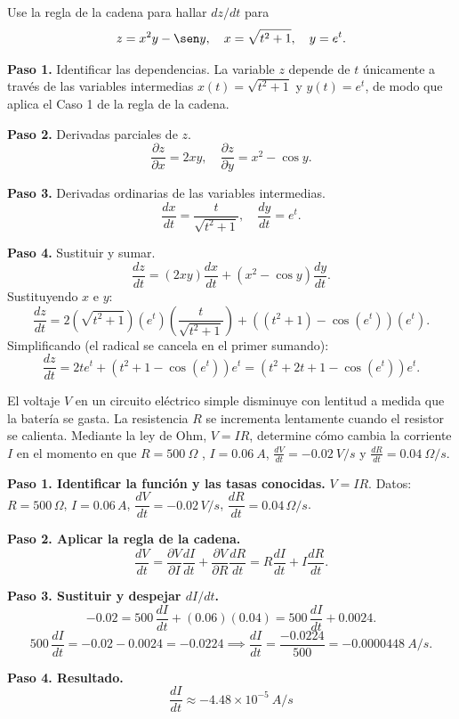 \begin{example}
Use la regla de la cadena para hallar $dz/dt$ para
\[
z = x^2 y - \sen y, \quad x = \sqrt{t^2 + 1}, \quad y = e^t.
\]
\begin{myproof}
\textbf{Paso 1.} Identificar las dependencias. La variable $z$ depende de $t$
únicamente a través de las variables intermedias $x(t) = \sqrt{t^2+1}$ y
$y(t) = e^t$, de modo que aplica el Caso 1 de la regla de la cadena.

\textbf{Paso 2.} Derivadas parciales de $z$.
\[
\frac{\partial z}{\partial x} = 2xy, \quad \frac{\partial z}{\partial y} = x^2 - \cos y.
\]

\textbf{Paso 3.} Derivadas ordinarias de las variables intermedias.
\[
\frac{dx}{dt} = \frac{t}{\sqrt{t^2+1}}, \quad \frac{dy}{dt} = e^t.
\]

\textbf{Paso 4.} Sustituir y sumar.
\[
\frac{dz}{dt} = (2xy)\frac{dx}{dt} + (x^2 - \cos y)\frac{dy}{dt}.
\]
Sustituyendo $x$ e $y$:
\[
\frac{dz}{dt} = 2\left(\sqrt{t^2+1}\right)(e^t)\left(\frac{t}{\sqrt{t^2+1}}\right) + \left((t^2+1) - \cos(e^t)\right)(e^t).
\]
Simplificando (el radical se cancela en el primer sumando):
\[
\frac{dz}{dt} = 2t e^t + \left(t^2 + 1 - \cos(e^t)\right)e^t = \boxed{\left(t^2 + 2t + 1 - \cos(e^t)\right)e^t}.
\]
\end{myproof}
\end{example}

\begin{prob}
El voltaje $V$ en un circuito eléctrico simple disminuye con lentitud a medida que la batería se gasta. La resistencia $R$ se incrementa lentamente cuando el resistor se calienta. Mediante la ley de Ohm, $V=IR$, determine cómo cambia la corriente $I$ en el momento en que $R=500\ \Omega$ , $I=0.06\  A$, $\frac{dV}{dt}=-0.02\ V/s$ y $\frac{dR}{dt}=0.04\ \Omega /s.$
\begin{myproof}
\textbf{Paso 1. Identificar la función y las tasas conocidas.}
$V=IR$. Datos: $R=500\,\Omega$, $I=0.06\,A$, $\dfrac{dV}{dt}=-0.02\,V/s$, $\dfrac{dR}{dt}=0.04\,\Omega/s$.

\textbf{Paso 2. Aplicar la regla de la cadena.}
\[
\frac{dV}{dt}=\frac{\partial V}{\partial I}\frac{dI}{dt}+\frac{\partial V}{\partial R}\frac{dR}{dt}
=R\frac{dI}{dt}+I\frac{dR}{dt}.
\]

\textbf{Paso 3. Sustituir y despejar $dI/dt$.}
\[
-0.02=500\,\frac{dI}{dt}+(0.06)(0.04)=500\,\frac{dI}{dt}+0.0024.
\]
\[
500\,\frac{dI}{dt}=-0.02-0.0024=-0.0224\implies
\frac{dI}{dt}=\frac{-0.0224}{500}=-0.0000448\ A/s.
\]

\textbf{Paso 4. Resultado.}
\[
\boxed{\frac{dI}{dt}\approx -4.48\times10^{-5}\ A/s}
\]
\end{myproof}
\end{prob}

